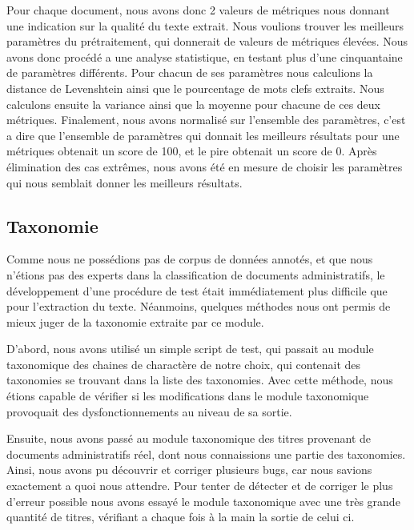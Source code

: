 Pour chaque document, nous avons donc 2 valeurs de métriques nous donnant une indication sur la qualité du texte extrait. Nous voulions trouver les meilleurs paramètres du prétraitement, qui donnerait de valeurs de métriques élevées. Nous avons donc procédé a une analyse statistique, en testant plus d'une cinquantaine de paramètres différents. Pour chacun de ses paramètres nous calculions la distance de Levenshtein ainsi que le pourcentage de mots clefs extraits. Nous calculons ensuite la variance ainsi que la moyenne pour chacune de ces deux métriques. Finalement, nous avons normalisé sur l'ensemble des paramètres, c'est a dire que l'ensemble de paramètres qui donnait les meilleurs résultats pour une métriques obtenait un score de 100, et le pire obtenait un score de 0. Après élimination des cas extrêmes, nous avons été en mesure de choisir les paramètres qui nous semblait donner les meilleurs résultats.
\subsection{Taxonomie}
Comme nous ne possédions pas de corpus de données annotés, et que nous n'étions pas des experts dans la classification de documents administratifs, le développement d'une procédure de test était immédiatement plus difficile que pour l'extraction du texte. Néanmoins, quelques méthodes nous ont permis de mieux juger de la taxonomie extraite par ce module. 

D'abord, nous avons utilisé un simple script de test, qui passait au module taxonomique des chaines de charactère de notre choix, qui contenait des taxonomies se trouvant dans la liste des taxonomies. Avec cette méthode, nous étions capable de vérifier si les modifications dans le module taxonomique provoquait des dysfonctionnements au niveau de sa sortie. 

Ensuite, nous avons passé au module taxonomique des titres provenant de documents administratifs réel, dont nous connaissions une partie des taxonomies. Ainsi, nous avons pu découvrir et corriger plusieurs bugs, car nous savions exactement a quoi nous attendre. Pour tenter de détecter et de corriger le plus d'erreur possible nous avons essayé le module taxonomique avec une très grande quantité de titres, vérifiant a chaque fois à la main la sortie de celui ci. 





